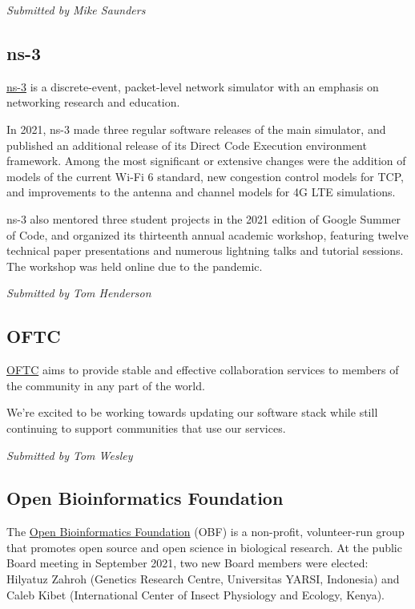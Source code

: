 \documentclass[a4paper]{report}
\begin{document}
{\em Submitted by Mike Saunders}

\subsection{ns-3}

\href{https://www.nsnam.org}{ns-3} is a discrete-event, packet-level network simulator with an emphasis on networking research and education.

In 2021, ns-3 made three regular software releases of the main simulator, and published an additional release of its Direct Code Execution environment framework.  Among the most significant or extensive changes were the addition of models of the current Wi-Fi 6 standard, new congestion control models for TCP, and improvements to the antenna and channel models for 4G LTE simulations.

ns-3 also mentored three student projects in the 2021 edition of Google Summer of Code, and organized its thirteenth annual academic workshop, featuring twelve technical paper presentations and numerous lightning talks and tutorial sessions.  The workshop was held online due to the pandemic.

{\em Submitted by Tom Henderson}

\subsection{OFTC}

\href{https://oftc.net/}{OFTC} aims to provide stable and effective collaboration services to members of the community in any part of the world.

We're excited to be working towards updating our software stack while still continuing to support communities that use our services.

{\em Submitted by Tom Wesley}

\subsection{Open Bioinformatics Foundation}

The \href{https://www.open-bio.org/}{Open Bioinformatics Foundation} (OBF) is a non-profit, volunteer-run group that promotes open source and open science in biological research. At the public Board meeting in September 2021, two new Board members were elected: Hilyatuz Zahroh (Genetics Research Centre, Universitas YARSI, Indonesia) and Caleb Kibet (International Center of Insect Physiology and Ecology, Kenya).
\end{document}
